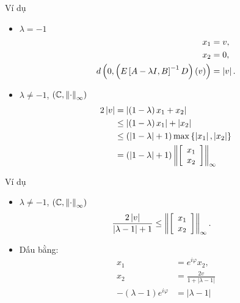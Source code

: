 \begin{frame}{Ví dụ}
\begin{itemize}
    \item \(\lambda = -1\)
        \begin{align}
            x_1 &= v,\\
            x_2 &= 0,\\
            d\left(0,\left(E\left[A-\lambda I,B\right]^{-1}D\right)\left(v\right)\right)&=\left\lvert v\right\rvert.
        \end{align}
    \item \(\lambda\ne-1\),  \(\left(\mathbb{C},\left\lVert\cdot\right\rVert_{\infty}\right)\)
        \begin{align}
            2\left\lvert v\right\rvert&=\left\lvert\left(1-\lambda\right)x_{1}+x_{2}\right\rvert \nonumber\\
            &\le\left\lvert\left(1-\lambda\right)x_{1}\right\rvert+\left\lvert x_{2}\right\rvert\nonumber\\
            &\le\left(\left|1-\lambda\right|+1\right)\max\left\{ \left|x_{1}\right|,\left|x_{2}\right|\right\} \nonumber\\
            &=\left(\left|1-\lambda\right|+1\right)\left\lVert\left[\begin{array}{c}
                x_{1}\\
                x_{2}
            \end{array}\right]\right\rVert_{\infty}
        \end{align}
    \end{itemize}
\end{frame}

\begin{frame}{Ví dụ}
\begin{itemize}
    \item \(\lambda\ne-1\),  \(\left(\mathbb{C},\left\lVert\cdot\right\rVert_{\infty}\right)\)
        \begin{align}
        \frac{2\left|v\right|}{\left|\lambda-1\right|+1}&\le\left\lVert\left[\begin{array}{c}
        x_{1}\\
        x_{2}
        \end{array}\right]\right\rVert_{\infty}.
        \end{align}
    \item Dấu bằng:
    \begin{align}
        x_{1}&=e^{i\varphi}x_{2},\\
        x_{2}&=\frac{2v}{1+\left|\lambda-1\right|}\\
        -\left(\lambda-1\right)e^{i\varphi}&=\left|\lambda-1\right|
    \end{align}
    \end{itemize}
\end{frame}

